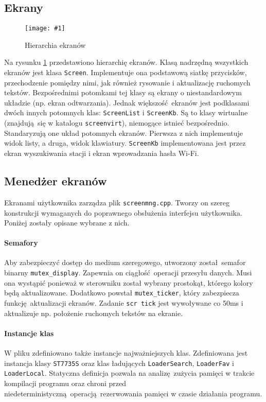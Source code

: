 \documentclass[polish]{aghengthesis}
\newcommand{\imgint}[4]{
	\begin{figure}[{#4}]
		\centering
		\texttt{[image: \#1]}
		\caption{#2}
		\label{#1}
	\end{figure}
}
\newcommand{\imgh}[3]{\imgint{#1}{#2}{#3}{H}}
\begin{document}
		\subsection{Ekrany}
			\imgh{3/PicoRadio-screens}{Hierarchia ekranów}{0.55} %
			Na rysunku \ref{3/PicoRadio-screens} przedstawiono hierarchię ekranów. Klasą nadrzędną wszystkich ekranów jest klasa \lstinline|Screen|. Implementuje ona podstawową siatkę przycisków, przechodzenie pomiędzy nimi, jak również rysowanie i aktualizację ruchomych tekstów. Bezpośrednimi potomkami tej klasy są ekrany o niestandardowym układzie (np. ekran odtwarzania). Jednak większość ekranów jest podklasami dwóch innych potomnych klas: \lstinline|ScreenList| i \lstinline|ScreenKb|. Są to klasy wirtualne (znajdują się w katalogu \lstinline|screenvirt|), niemogące istnieć bezpośrednio. Standaryzują one układ potomnych ekranów. Pierwsza z nich implementuje widok listy, a druga, widok klawiatury. \lstinline|ScreenKb| implementowana jest przez ekran wyszukiwania stacji i ekran wprowadzania hasła Wi-Fi.
			
		\subsection{Menedżer ekranów}
			Ekranami użytkownika zarządza plik \lstinline|screenmng.cpp|. Tworzy on szereg konstrukcji wymaganych do poprawnego obsłużenia interfejsu użytkownika. Poniżej zostały opisane wybrane z nich.
			
			\paragraph{Semafory}
				Aby zabezpieczyć dostęp do medium szeregowego, utworzony został semafor binarny \lstinline|mutex_display|. Zapewnia on ciągłość operacji przesyłu danych. Musi ona wystąpić ponieważ w sterowniku został wybrany prostokąt, którego kolory będą aktualizowane. Dodatkowo powstał \lstinline|mutex_ticker|, który zabezpiecza funkcję aktualizacji ekranów. Zadanie \lstinline|scr tick| jest wywoływane co 50ms i aktualizuje np. położenie ruchomych tekstów na ekranie.
				
			\paragraph{Instancje klas}
				W pliku zdefiniowano także instancje najważniejszych klas. Zdefiniowana jest instancja klasy \lstinline|ST7735S| oraz klas ładujących \lstinline|LoaderSearch|, \lstinline|LoaderFav| i \lstinline|LoaderLocal|. Statyczna definicja pozwala na analizę zużycia pamięci w trakcie kompilacji programu oraz chroni przed niedeterministyczną operacją rezerwowania pamięci w czasie działania programu.
				
\end{document}

